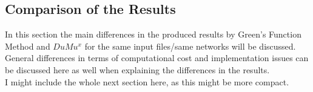 \subsection{Comparison of the Results}
In this section the main differences in the produced results by Green's Function Method and $DuMu^x$ for the same input files/same networks will be discussed.
\\General differences in terms of computational cost and implementation issues can be discussed here as well when explaining the differences in the results.
\\I might include the whole next section here, as this might be more compact.





